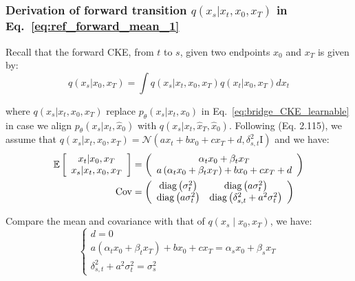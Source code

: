 \subsubsection{Derivation of forward transition $q\left(x_{s}|x_{t},x_{0},x_{T}\right)$
in Eq.~\ref{eq:ref_forward_mean_1}}

Recall that the forward CKE, from $t$ to $s$, given two endpoints
$x_{0}$ and $x_{T}$ is given by:
\[
q\left(x_{s}|x_{0},x_{T}\right)=\int q\left(x_{s}|x_{t},x_{0},x_{T}\right)q\left(x_{t}|x_{0},x_{T}\right)dx_{t}
\]

\noindent where $q\left(x_{s}|x_{t},x_{0},x_{T}\right)$ replace $p_{\theta}\left(x_{s}|x_{t},x_{0}\right)$
in Eq.~\ref{eq:bridge_CKE_learnable} in case we align $p_{\theta}\left(x_{s}|x_{t},\hat{x}_{0}\right)$
with $q\left(x_{s}|x_{t},\hat{x}_{T},\hat{x}_{0}\right)$. Following
\cite{bishop2006pattern} (Eq. 2.115), we assume that $q\left(x_{s}|x_{t},x_{0},x_{T}\right)=\mathcal{N}\left(ax_{t}+bx_{0}+cx_{T}+d,\delta_{s,t}^{2}\mathrm{I}\right)$
and we have:
\begin{align}
\mathbb{E}\left[\begin{array}{c}
x_{t}|x_{0},x_{T}\\
x_{s}|x_{t},x_{0},x_{T}
\end{array}\right] & =\left(\begin{array}{c}
\alpha_{t}x_{0}+\beta_{t}x_{T}\\
a\left(\alpha_{t}x_{0}+\beta_{t}x_{T}\right)+bx_{0}+cx_{T}+d
\end{array}\right)\\
\text{Cov} & =\left(\begin{array}{cc}
\text{diag}\left(\sigma_{t}^{2}\right) & \text{diag}\left(a\sigma_{t}^{2}\right)\\
\text{diag}\left(a\sigma_{t}^{2}\right) & \text{diag}\left(\delta_{s,t}^{2}+a^{2}\sigma_{t}^{2}\right)
\end{array}\right)
\end{align}

\noindent Compare the mean and covariance with that of $q\left(x_{s}\mid x_{0},x_{T}\right)$,
we have:
\begin{equation}
\begin{cases}
d=0\\
a\left(\alpha_{t}x_{0}+\beta_{t}x_{T}\right)+bx_{0}+cx_{T}=\alpha_{s}x_{0}+\beta_{s}x_{T}\\
\delta_{s,t}^{2}+a^{2}\sigma_{t}^{2}=\sigma_{s}^{2}
\end{cases}
\end{equation}

